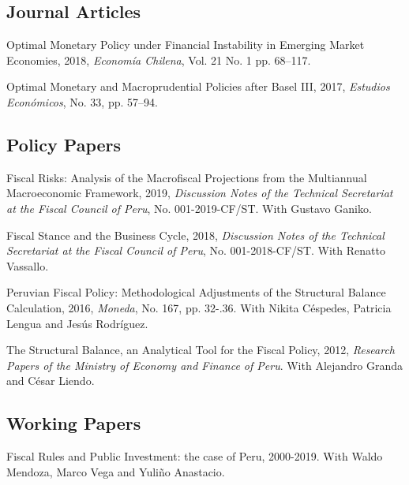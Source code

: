 \documentclass[letterpaper, Biolinum]{article}
\renewenvironment{itemize}{
  \begin{list}{}{
    \setlength{\leftmargin}{1.5em}
  }
}{
  \end{list}
}
\begin{document}
\subsection*{Journal Articles}

\begin{itemize}
\item Optimal Monetary Policy under Financial Instability in Emerging Market Economies, 2018, {\it Econom\'ia Chilena}, Vol. 21 No. 1 pp. 68--117.
\item Optimal Monetary and Macroprudential Policies after Basel III, 2017, {\it Estudios Econ\'omicos}, No. 33, pp. 57--94.
\end{itemize}

\subsection*{Policy Papers}

\begin{itemize}
\item Fiscal Risks: Analysis of the Macrofiscal Projections from the Multiannual Macroeconomic Framework, 2019, {\it Discussion Notes of the Technical Secretariat at the Fiscal Council of Peru}, No. 001-2019-CF/ST. With Gustavo Ganiko.
\item Fiscal Stance and the Business Cycle, 2018, {\it Discussion Notes of the Technical Secretariat at the Fiscal Council of Peru}, No. 001-2018-CF/ST. With Renatto Vassallo.
\item Peruvian Fiscal Policy: Methodological Adjustments of the Structural Balance Calculation, 2016, {\it Moneda}, No. 167, pp. 32-.36. With Nikita C\'espedes, Patricia Lengua and Jes\'us Rodr\'iguez. 
\item The Structural Balance, an Analytical Tool for the Fiscal Policy, 2012, {\it Research Papers of the Ministry of Economy and Finance of Peru}. With Alejandro Granda and C\'esar Liendo.
\end{itemize}

\subsection*{Working Papers}

\begin{itemize}
\item Fiscal Rules and Public Investment: the case of Peru, 2000-2019. With Waldo Mendoza, Marco Vega and Yuli\~no Anastacio.
\end{itemize}
\end{document}
